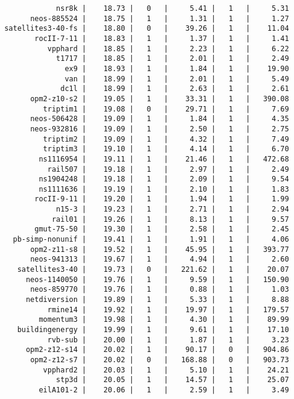 \begin{lstlisting}
             nsr8k |    18.73 |   0   |     5.41 |   1   |     5.31
       neos-885524 |    18.75 |   1   |     1.31 |   1   |     1.27
 satellites3-40-fs |    18.80 |   0   |    39.26 |   1   |    11.04
        rocII-7-11 |    18.83 |   1   |     1.37 |   1   |     1.41
           vpphard |    18.85 |   1   |     2.23 |   1   |     6.22
             t1717 |    18.85 |   1   |     2.01 |   1   |     2.49
               ex9 |    18.93 |   1   |     1.84 |   1   |    19.90
               van |    18.99 |   1   |     2.01 |   1   |     5.49
              dc1l |    18.99 |   1   |     2.63 |   1   |     2.61
       opm2-z10-s2 |    19.05 |   1   |    33.31 |   1   |   390.08
          triptim1 |    19.08 |   0   |    29.71 |   1   |     7.69
       neos-506428 |    19.09 |   1   |     1.84 |   1   |     4.35
       neos-932816 |    19.09 |   1   |     2.50 |   1   |     2.75
          triptim2 |    19.09 |   1   |     4.32 |   1   |     7.49
          triptim3 |    19.10 |   1   |     4.14 |   1   |     6.70
         ns1116954 |    19.11 |   1   |    21.46 |   1   |   472.68
           rail507 |    19.18 |   1   |     2.97 |   1   |     2.49
         ns1904248 |    19.18 |   1   |     2.09 |   1   |     9.54
         ns1111636 |    19.19 |   1   |     2.10 |   1   |     1.83
        rocII-9-11 |    19.20 |   1   |     1.94 |   1   |     1.99
             n15-3 |    19.23 |   1   |     2.71 |   1   |     2.94
            rail01 |    19.26 |   1   |     8.13 |   1   |     9.57
        gmut-75-50 |    19.30 |   1   |     2.58 |   1   |     2.45
   pb-simp-nonunif |    19.41 |   1   |     1.91 |   1   |     4.06
       opm2-z11-s8 |    19.52 |   1   |    45.95 |   1   |   393.77
       neos-941313 |    19.67 |   1   |     4.94 |   1   |     2.60
    satellites3-40 |    19.73 |   0   |   221.62 |   1   |    20.07
      neos-1140050 |    19.76 |   1   |     9.59 |   1   |   150.90
       neos-859770 |    19.76 |   1   |     0.88 |   1   |     1.03
      netdiversion |    19.89 |   1   |     5.33 |   1   |     8.88
           rmine14 |    19.92 |   1   |    19.97 |   1   |   179.57
         momentum3 |    19.98 |   1   |     4.30 |   1   |    89.99
    buildingenergy |    19.99 |   1   |     9.61 |   1   |    17.10
           rvb-sub |    20.00 |   1   |     1.87 |   1   |     3.23
      opm2-z12-s14 |    20.02 |   1   |    90.17 |   0   |   904.86
       opm2-z12-s7 |    20.02 |   0   |   168.88 |   0   |   903.73
          vpphard2 |    20.03 |   1   |     5.10 |   1   |    24.21
             stp3d |    20.05 |   1   |    14.57 |   1   |    25.07
         eilA101-2 |    20.06 |   1   |     2.59 |   1   |     3.49

\end{lstlisting}
